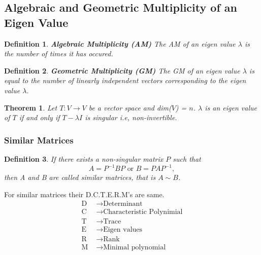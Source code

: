 \documentclass[a4paper, titlepage]{article}
\newtheorem{theorem}{Theorem}[section]
\newtheorem{definition}{Definition}[section]
\begin{document}
        \subsection{Algebraic and Geometric Multiplicity of an Eigen Value}
        \begin{definition}
            \textup{\textbf{Algebraic Multiplicity (AM)}} The AM of
            an eigen value $\lambda$ is the number of times it has occured.
        \end{definition}

        \begin{definition}
            \textup{\textbf{Geometric Multiplicity (GM)}} The GM of
            an eigen value $\lambda$ is equal to the number of linearly
            independent vectors corresponding to the eigen value $\lambda$.
        \end{definition}
        
        \begin{theorem}
            Let $T: V \to V$ be a vector space and \textup{dim($V$)} = $n$.
            $\lambda$ is an eigen value of $T$ if and only if $T - \lambda I$
            is singular i.e, non-invertible.
        \end{theorem}
        
        \subsubsection{Similar Matrices}
            \begin{definition}
                If there exists a non-singular matrix $P$ such that 
                \[ A = P^{-1}BP \text{ or } B = PAP^{-1}, \] then A
                and B are called similar matrices, that is $A \sim B$.
            \end{definition}
            \noindent For similar matrices their D.C.T.E.R.M's are same.
            \begin{align*}
                \text{D } &\to \text{Determinant} \\ 
                \text{C } &\to \text{Characteristic Polynimial} \\ 
                \text{T } &\to \text{Trace} \\ 
                \text{E } &\to \text{Eigen values} \\ 
                \text{R } &\to \text{Rank} \\ 
                \text{M } &\to \text{Minimal polynomial}
            \end{align*} 
\end{document}
